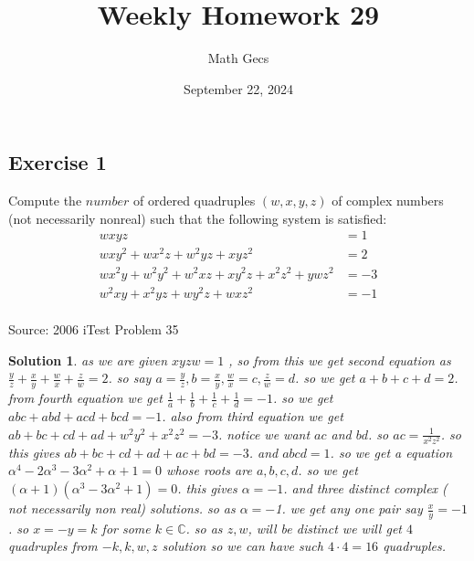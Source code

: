 \documentclass[12pt]{article}
\title{Weekly Homework 29}
\author{Math Gecs}
\date{September 22, 2024}
\newtheorem*{solution*}{Solution}
\begin{document}
\maketitle

\subsection*{Exercise 1}
Compute the $\textit{number}$ of ordered quadruples $(w,x,y,z)$ of complex numbers (not necessarily nonreal) such that the following system is satisfied:\begin{align*} wxyz&=1\\ wxy^2 + wx^2z + w^2yz + xyz^2&=2\\ wx^2y + w^2y^2 + w^2xz + xy^2z + x^2z^2 + ywz^2 &= -3\\ w^2xy + x^2yz + wy^2z + wxz^2 &= -1 \end{align*}\\

Source: 2006 iTest Problem 35\\


\begin{solution*}
as we are given $xyzw=1$ , so from this we get second equation as $\frac{y}{z}+\frac{x}{y}+\frac{w}{x}+\frac{z}{w}=2$. so say $a=\frac{y}{z} , b=\frac{x}{y}, \frac{w}{x}=c,\frac{z}{w}=d$. so we get $a+b+c+d=2$. from fourth equation we get $\frac{1}{a}+\frac{1}{b}+\frac{1}{c}+\frac{1}{d}=-1$. so we get $abc+abd+acd+bcd=-1$. also from third equation we get $ab+bc+cd+ad+w^2y^2+x^2z^2=-3$. notice we want $ac$ and $bd$. so $ac=\frac{1}{x^2z^2}$. so this gives $ab+bc+cd+ad+ac+bd=-3$. and $abcd=1$. so we get a equation $\alpha^{4}-2\alpha^{3}-3\alpha^2+\alpha+1=0$ whose roots are $a,b,c,d$. so we get $(\alpha+1)(\alpha^3-3\alpha^2+1)=0$. this gives $\alpha=-1$. and three distinct complex ( not necessarily non real) solutions. so as $\alpha=-$1. we get any one pair say $\frac{x}{y}=-1$. so $x=-y=k$ for some $k \in \mathbb{C}$. so as $z,w$, will be distinct we will get $4$ quadruples from $-k,k,w,z$ solution so we can have such $4 \cdot 4 =\boxed{16}$ quadruples.
\end{solution*}
\end{document}
